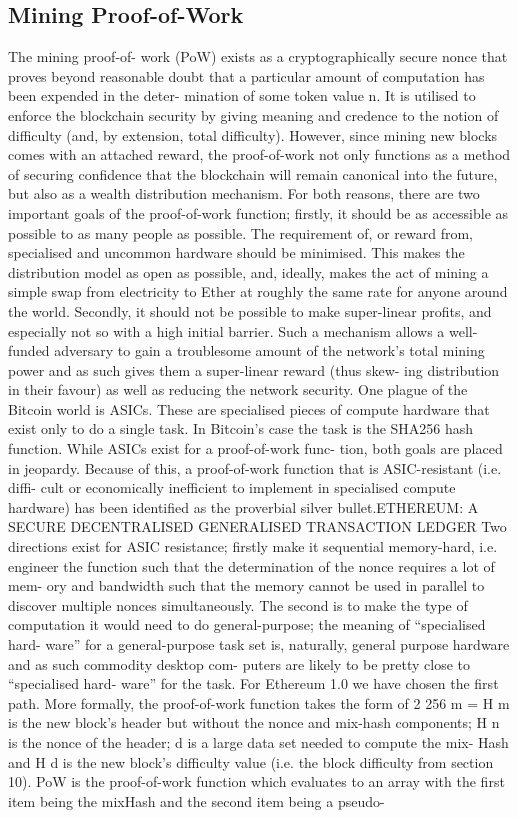 \documentclass[10pt,a4paper,leqno,bibliography=totoc]{scrartcl}
\newenvironment{alphafootnotes}
{\par\edef\savedfootnotenumber{\number\value{footnote}}
\renewcommand{\thefootnote}{\alph{footnote}}
\setcounter{footnote}{0}}
{\par\setcounter{footnote}{\savedfootnotenumber}}
\begin{document}
\begin{alphafootnotes}
\begin{multicols*}{2}
		\subsection{Mining Proof-of-Work} The mining proof-of- work (PoW) exists as a cryptographically secure nonce that proves beyond reasonable doubt that a particular amount of computation has been expended in the deter- mination of some token value n. It is utilised to enforce the blockchain security by giving meaning and credence to the notion of difficulty (and, by extension, total difficulty). However, since mining new blocks comes with an attached reward, the proof-of-work not only functions as a method of securing confidence that the blockchain will remain canonical into the future, but also as a wealth distribution mechanism. For both reasons, there are two important goals of the proof-of-work function; firstly, it should be as accessible as possible to as many people as possible. The requirement of, or reward from, specialised and uncommon hardware should be minimised. This makes the distribution model as open as possible, and, ideally, makes the act of mining a simple swap from electricity to Ether at roughly the same rate for anyone around the world. Secondly, it should not be possible to make super-linear profits, and especially not so with a high initial barrier. Such a mechanism allows a well-funded adversary to gain a troublesome amount of the network’s total mining power and as such gives them a super-linear reward (thus skew- ing distribution in their favour) as well as reducing the network security. One plague of the Bitcoin world is ASICs. These are specialised pieces of compute hardware that exist only to do a single task. In Bitcoin’s case the task is the SHA256 hash function. While ASICs exist for a proof-of-work func- tion, both goals are placed in jeopardy. Because of this, a proof-of-work function that is ASIC-resistant (i.e. diffi- cult or economically inefficient to implement in specialised compute hardware) has been identified as the proverbial silver bullet.ETHEREUM: A SECURE DECENTRALISED GENERALISED TRANSACTION LEDGER Two directions exist for ASIC resistance; firstly make it sequential memory-hard, i.e. engineer the function such that the determination of the nonce requires a lot of mem- ory and bandwidth such that the memory cannot be used in parallel to discover multiple nonces simultaneously. The second is to make the type of computation it would need to do general-purpose; the meaning of “specialised hard- ware” for a general-purpose task set is, naturally, general purpose hardware and as such commodity desktop com- puters are likely to be pretty close to “specialised hard- ware” for the task. For Ethereum 1.0 we have chosen the first path. More formally, the proof-of-work function takes the form of 2 256 m = H m is the new block’s header but without the nonce and mix-hash components; H n is the nonce of the header; d is a large data set needed to compute the mix- Hash and H d is the new block’s difficulty value (i.e. the block difficulty from section 10). PoW is the proof-of-work function which evaluates to an array with the first item being the mixHash and the second item being a pseudo- 
\end{multicols*}
\end{alphafootnotes}
\end{document}
